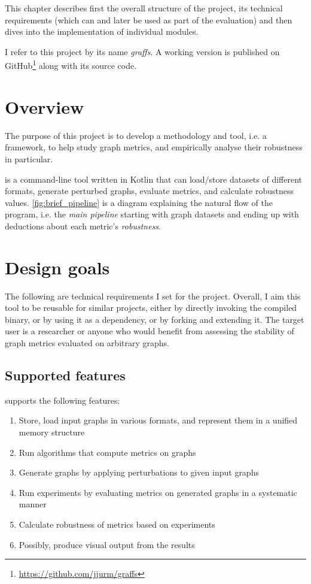 This chapter describes first the overall structure of the project, its technical requirements (which can and later be used as part of the evaluation) and then dives into the implementation of individual modules.

I refer to this project by its name \textsl{graffs}.
A working version is published on GitHub\footnote{\url{https://github.com/jjurm/graffs}} along with its source code.


\section{Overview}

The purpose of this project is to develop a methodology and tool, i.e. a framework, to help study graph metrics, and empirically analyse their robustness in particular.

\graffs is a command-line tool written in Kotlin that can load/store datasets of different formats, generate perturbed graphs, evaluate metrics, and calculate robustness values. \autoref{fig:brief_pipeline} is a diagram explaining the natural flow of the program, i.e. the \textsl{main pipeline} starting with graph datasets and ending up with deductions about each metric's \textsl{robustness}.



\section{Design goals}\label{sec:design-goals}

The following are technical requirements I set for the project.
Overall, I aim this tool to be reusable for similar projects, either by directly invoking the compiled binary, or by using it as a dependency, or by forking and extending it.
The target user is a researcher or anyone who would benefit from assessing the stability of graph metrics evaluated on arbitrary graphs.

\subsection{Supported features}

\graffs supports the following features:

\begin{enumerate}[itemsep=0pt,topsep=5pt]
    \item Store, load input graphs in various formats, and represent them in a unified memory structure
    \item Run algorithms that compute metrics on graphs
    \item Generate graphs by applying perturbations to given input graphs
    \item Run experiments by evaluating metrics on generated graphs in a systematic manner
    \item Calculate robustness of metrics based on experiments
    \item Possibly, produce visual output from the results
\end{enumerate}

